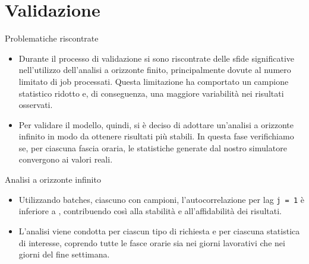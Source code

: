 \documentclass[xcolor=table]{beamer}
\newcommand{\key}[1]{\texttt{\StrSubstitute{#1}{_}{\_}}}
\begin{document}
\section{Validazione}

\begin{frame}{Problematiche riscontrate}\justifying
\begin{itemize}
\item Durante il processo di validazione si sono riscontrate delle sfide significative nell'utilizzo dell'analisi a orizzonte finito, principalmente dovute al numero limitato di job processati. Questa limitazione ha comportato un campione statistico ridotto e, di conseguenza, una maggiore variabilità nei risultati osservati.

\item Per validare il modello, quindi, si è deciso di adottare un'analisi a orizzonte infinito in modo da ottenere risultati più stabili. In questa fase verifichiamo se, per ciascuna fascia oraria, le statistiche generate dal nostro simulatore convergono ai valori reali. 
\end{itemize}
\end{frame}

\begin{frame}{Analisi a orizzonte infinito}\justifying
\begin{itemize}
\item Utilizzando \key{k = 128} batches, ciascuno con \key{b = 1024} campioni, l'autocorrelazione per lag \texttt{j = 1} è inferiore a \key{0.2}, contribuendo così alla stabilità e all'affidabilità dei risultati.
\item L'analisi viene condotta per ciascun tipo di richiesta e per ciascuna statistica di interesse, coprendo tutte le fasce orarie sia nei giorni lavorativi che nei giorni del fine settimana.
\end{itemize}
\end{frame}
\end{document}
